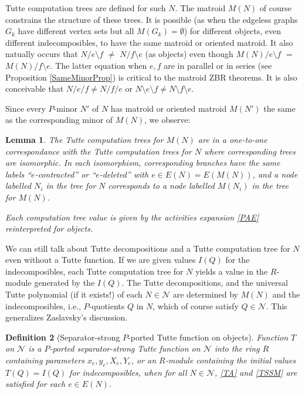 \documentclass[12pt,leqno]{amsart}
\newtheorem{lem}{Lemma}
\newtheorem{definition}[lem]{Definition}
\theoremstyle{remark}
\begin{document}
Tutte computation trees are defined for such $N$.
The matroid $M(N)$ of course
constrains the structure of these trees.  
It is possible
(as when the edgeless graphs $G_k$ have different vertex sets but all
$M(G_k)=\emptyset$)
for different objects, 
even different indecomposibles, to have the same 
matroid or oriented matroid.  It also natually occurs 
that
$N/e\setminus f$ $\neq$ 
$N/f\setminus e$ (as objects) even though 
$M(N)/e\setminus f$ $=$ 
$M(N)/f\setminus e$.  The latter equation when 
$e,f$ are in parallel or in series (see Proposition
\ref{SameMinorProp}) is critical to the matroid ZBR theorems.
It is also conceivable that $N/e/f\neq N/f/e$ or
$N\setminus e\setminus f\neq N\setminus f\setminus e$.

Since every $P$-minor $N'$ of $N$ has matroid
or oriented matroid $M(N')$ the same as the corresponding
minor of $M(N)$, we observe:

\begin{lem}
\label{ObjectTreeValueLemma}
The Tutte computation trees for $M(N)$ are in a one-to-one
correspondance with the 
Tutte computation trees for $N$ 
where corresponding trees are isomorphic.  In each
isomorphism,
corresponding
branches have the same labels ``$e$-contracted'' or
``$e$-deleted'' with $e\in E(N)=E(M(N))$, and a node
labelled $N_i$ in the tree for $N$ corresponds to 
a node labelled $M(N_i)$ in the tree for $M(N)$.

Each computation tree value is given by
the activities expansion \eqref{PAE} reinterpreted for
objects.
\end{lem}


We can still talk about Tutte decompositions and a
Tutte computation tree for $N$ even  without 
a Tutte function.  If we are given values $I(Q)$
for the indecomposibles, each Tutte computation tree 
for $N$ yields a value in the $R$-module generated by
the $I(Q)$.
The Tutte decompositions, and the universal
Tutte polynomial (if it exists!)
of each $N\in \mathcal{N}$
are determined by $M(N)$ and the indecomposibles, i.e., $P$-quotients
$Q$ in $N$, which of course satisfy $Q \in \mathcal{N}$.
This generalizes Zaslavsky's discussion\cite{MR93a:05047}.

\begin{definition}[Separator-strong $P$-ported Tutte function on objects]

Function
$T$ on $\mathcal{N}$
is a $P$-ported separator-strong Tutte function
on $\mathcal{N}$ into 
the ring $R$ 
containing parameters $x_e, y_e, X_e, Y_e$,
or an $R$-module containing the initial values
$T(Q)=I(Q)$ for indecomposibles,
when for all $N\in\mathcal{N}$,
\eqref{TA} and \eqref{TSSM} are
satisfied for each
$e\in E(N)$.
\end{definition}
\end{document}
